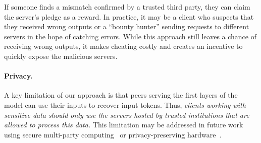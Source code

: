 If someone finds a mismatch confirmed by a trusted third party, they can claim the server's pledge as a reward. In practice, it may be a client who suspects that they received wrong outputs or a ``bounty hunter'' sending requests to different servers in the hope of catching errors.
While this approach still leaves a chance of receiving wrong outputs, it makes cheating costly and creates an incentive to quickly expose the malicious servers.

\paragraph{Privacy.} A key limitation of our approach is that peers serving the first layers of the model can use their inputs to recover input tokens. Thus, \textit{clients working with sensitive data should only use the servers hosted by trusted institutions that are allowed to process this data.}
This limitation may be addressed in future work using secure multi-party computing~\cite{evans2018pragmatic} or privacy-preserving hardware~\cite{nvidia-privacy}.






